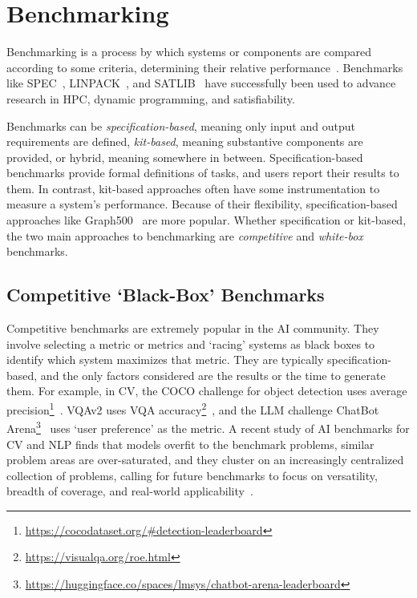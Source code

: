 \section{Benchmarking}
\label{section:31-literature-benchmarking}

Benchmarking is a process by which systems or components are compared according to some criteria, determining their relative performance~\cite{Kistowski2015}.
Benchmarks like SPEC~\cite{Hennessy2019}, LINPACK~\cite{Dongarra2003}, and SATLIB~\cite{Hoos2000} have successfully been used to advance research in \ac{HPC}, dynamic programming, and satisfiability.

Benchmarks can be \textit{specification-based}, meaning only input and output requirements are defined, \textit{kit-based}, meaning substantive components are provided, or hybrid, meaning somewhere in between.
Specification-based benchmarks provide formal definitions of tasks, and users report their results to them. In contrast, kit-based approaches often have some instrumentation to measure a system's performance.
Because of their flexibility, specification-based approaches like Graph500~\cite{Murphy2010} are more popular.
Whether specification or kit-based, the two main approaches to benchmarking are \textit{competitive} and \textit{white-box} benchmarks. 

\subsection{Competitive `Black-Box' Benchmarks}
Competitive benchmarks are extremely popular in the \ac{AI} community. 
They involve selecting a metric or metrics and `racing' systems as black boxes to identify which system maximizes that metric. 
They are typically specification-based, and the only factors considered are the results or the time to generate them.
For example, in \ac{CV}, the \ac{COCO} challenge for object detection uses average precision\footnote{\scriptsize \url{https://cocodataset.org/\#detection-leaderboard}}~\cite{Lin2014}.
VQAv2 uses \ac{VQA} accuracy\footnote{\scriptsize \url{https://visualqa.org/roe.html}}~\cite{Goyal2017}, and the \ac{LLM} challenge ChatBot Arena\footnote{\scriptsize \url{https://huggingface.co/spaces/lmsys/chatbot-arena-leaderboard}}~\cite{Zheng2024} uses `user preference' as the metric.
A recent study of \ac{AI} benchmarks for \ac{CV} and \ac{NLP} finds that models overfit to the benchmark problems, similar problem areas are over-saturated, and they cluster on an increasingly centralized collection of problems, calling for future benchmarks to focus on versatility, breadth of coverage, and real-world applicability~\cite{Barbosa2022}. 

